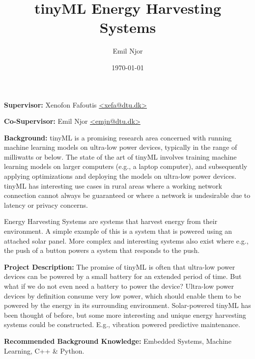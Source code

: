 \documentclass{article}
\author{Emil Njor}
\title{tinyML Energy Harvesting Systems}
\date{\today}
\begin{document}
\maketitle
\textbf{Supervisor:} Xenofon Fafoutis \href{mailto:xefa@dtu.dk}{\textless{}xefa@dtu.dk\textgreater}

\textbf{Co-Supervisor:} Emil Njor \href{mailto:emjn@dtu.dk}{\textless{}emjn@dtu.dk\textgreater}

\textbf{Background:} tinyML is a promising research area concerned with running machine learning models on ultra-low power devices, typically in the range of milliwatts or below.
The state of the art of tinyML involves training machine learning models on larger computers (e.g., a laptop computer), and subsequently applying optimizations and deploying the models on ultra-low power devices.
tinyML has interesting use cases in rural areas where a working network connection cannot always be guaranteed or where a network is undesirable due to latency or privacy concerns.

Energy Harvesting Systems are systems that harvest energy from their environment.
A simple example of this is a system that is powered using an attached solar panel.
More complex and interesting systems also exist where e.g., the push of a button powers a system that responds to the push.

\textbf{Project Description:} The promise of tinyML is often that ultra-low power devices can be powered by a small battery for an extended period of time.
But what if we do not even need a battery to power the device?
Ultra-low power devices by definition consume very low power, which should enable them to be powered by the energy in its surrounding environment. Solar-powered tinyML has been thought of before, but some more interesting and unique energy harvesting systems could be constructed. E.g., vibration powered predictive maintenance.

\textbf{Recommended Background Knowledge:} Embedded Systems, Machine Learning, C++ \& Python.
\end{document}
